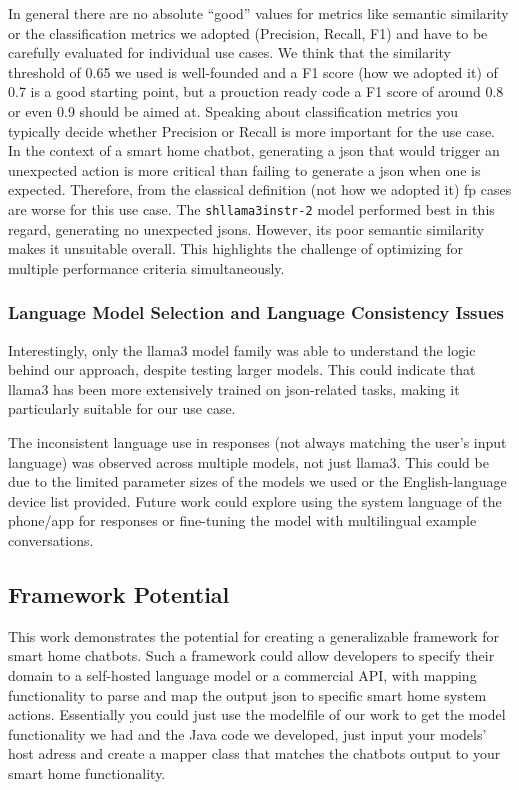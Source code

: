 In general there are no absolute ``good'' values for metrics like semantic similarity \cite{muhammad2022_similarity} or the classification metrics \cite{yacouby-axman-2020-probabilistic,dasExplainableActivityRecognition2023} we adopted (Precision, Recall, F1) and have to be carefully evaluated for individual use cases.
We think that the similarity threshold of 0.65 we used is well-founded and a F1 score (how we adopted it) of 0.7 is a good starting point, but a prouction ready code a F1 score of around 0.8 or even 0.9 should be aimed at.
Speaking about classification metrics you typically decide whether Precision or Recall is more important for the use case. In the context of a smart home chatbot, generating a \gls{json} that would trigger an unexpected action is more critical than failing to generate a \gls{json} when one is expected. Therefore, from the classical definition (not how we adopted it) \gls{fp} cases are worse for this use case.
The \texttt{shllama3instr-2} model performed best in this regard, generating no unexpected \glspl{json}. 
However, its poor semantic similarity makes it unsuitable overall. This highlights the challenge of optimizing for multiple performance criteria simultaneously.

\subsubsection{Language Model Selection and Language Consistency Issues}
Interestingly, only the llama3 model family was able to understand the logic behind our approach, despite testing larger models. This could indicate that llama3 has been more extensively trained on \gls{json}-related tasks, making it particularly suitable for our use case.

The inconsistent language use in responses (not always matching the user's input language) was observed across multiple models, not just llama3. This could be due to the limited parameter sizes of the models we used or the English-language device list provided. Future work could explore using the system language of the phone/app for responses or fine-tuning the model with multilingual example conversations.

\subsection{Framework Potential}
This work demonstrates the potential for creating a generalizable framework for smart home chatbots. Such a framework could allow developers to specify their domain to a self-hosted language model or a commercial API, with mapping functionality to parse and map the output \gls{json} to specific smart home system actions. Essentially you could just use the modelfile of our work to get the model functionality we had and the Java code we developed, just input your models' host adress and create a mapper class that matches the chatbots output to your smart home functionality.

